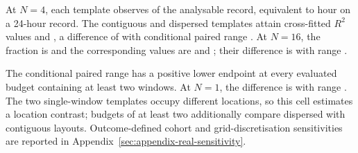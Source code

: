 At $N=4$, each template observes \numAfObservedPctFour{} of the analysable
record, equivalent to \numAfEquivalentHoursFour{} hour on a 24-hour record.
The contiguous and dispersed templates attain cross-fitted $R^2$ values
\numCfAfContigOneHour{} and \numCfAfDispOneHour, a difference of
\numAfBootDiffFour{} with conditional paired range \numAfBootRangeFour. At
$N=16$, the fraction is \numAfObservedPctSixteen{} and the corresponding
values are \numCfAfContigFourHour{} and \numCfAfDispFourHour; their difference
is \numAfBootDiffSixteen{} with range \numAfBootRangeSixteen.

The conditional paired range has a positive lower endpoint at every evaluated
budget containing at least two windows. At $N=1$, the difference is
\numAfBootDiffOne{} with range \numAfBootRangeOne. The two single-window
templates occupy different locations, so this cell estimates a location
contrast; budgets of at least two additionally compare dispersed with
contiguous layouts. Outcome-defined cohort and grid-discretisation sensitivities
are reported in Appendix~\ref{sec:appendix-real-sensitivity}.
